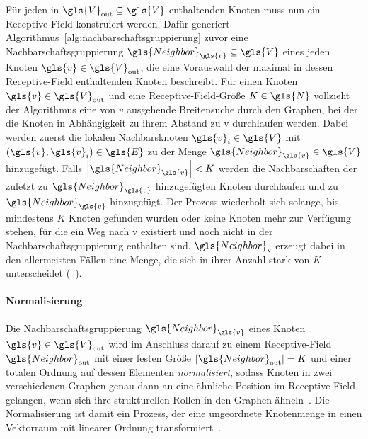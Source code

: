 Für jeden in $\gls{V}_{\mathrm{out}} \subseteq \gls{V}$ enthaltenden Knoten muss nun ein Receptive-Field konstruiert werden.
Dafür generiert Algorithmus~\ref{alg:nachbarschaftsgruppierung} zuvor eine Nachbarschaftsgruppierung $\gls{Neighbor}_{\gls{v}} \subseteq \gls{V}$ eines jeden Knoten $\gls{v} \in \gls{V}_{\mathrm{out}}$, die eine Vorauswahl der maximal in dessen Receptive-Field enthaltenden Knoten beschreibt.
Für einen Knoten $\gls{v} \in \gls{V}_{\mathrm{out}}$ und eine Receptive-Field-Größe $K \in \gls{N}$ vollzieht der Algorithmus eine von $v$ ausgehende Breitensuche durch den Graphen, bei der die Knoten in Abhängigkeit zu ihrem Abstand zu \gls{v} durchlaufen werden.
Dabei werden zuerst die lokalen Nachbarsknoten $\gls{v}_i \in \gls{V}$ mit $\left(\gls{v}, \gls{v}_i\right) \in \gls{E}$ zu der Menge $\gls{Neighbor}_{\gls{v}} \in \gls{V}$ hinzugefügt.
Falls $\left|\gls{Neighbor}_{\gls{v}}\right| < K$ werden die Nachbarschaften der zuletzt zu $\gls{Neighbor}_{\gls{v}}$ hinzugefügten Knoten durchlaufen und zu $\gls{Neighbor}_{\gls{v}}$ hinzugefügt.
Der Prozess wiederholt sich solange, bis mindestens $K$ Knoten gefunden wurden oder keine Knoten mehr zur Verfügung stehen, für die ein Weg nach \gls{v} existiert und noch nicht in der Nachbarschaftsgruppierung enthalten sind.
$\gls{Neighbor}_{\mathrm{v}}$ erzeugt dabei in den allermeisten Fällen eine Menge, die sich in ihrer Anzahl stark von $K$ unterscheidet (\vgl{}~\cite{patchy}).

\paragraph{Normalisierung}
\label{normalisierung}

Die Nachbarschaftsgruppierung $\gls{Neighbor}_{\gls{v}}$ eines Knoten $\gls{v} \in \gls{V}_{\mathrm{out}}$ wird im Anschluss darauf zu einem Receptive-Field $\gls{Neighbor}_{\mathrm{out}}$ mit einer festen Größe $\left|\gls{Neighbor}_{\mathrm{out}}\right| = K$ und einer totalen Ordnung auf dessen Elementen \emph{normalisiert}, sodass Knoten in zwei verschiedenen Graphen genau dann an eine ähnliche Position im Receptive-Field gelangen, wenn sich ihre strukturellen Rollen in den Graphen ähneln~\cite{patchy}.
Die Normalisierung ist damit ein Prozess, der eine ungeordnete Knotenmenge in einen Vektorraum mit linearer Ordnung transformiert~\cite{patchy}.

